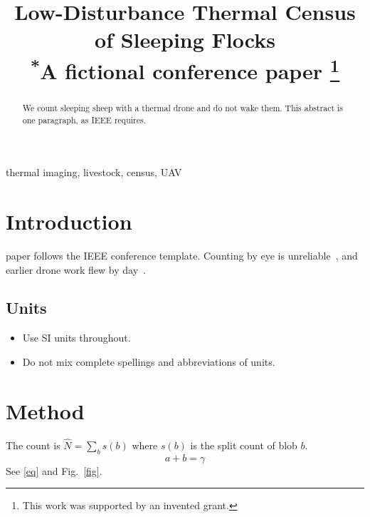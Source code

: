 \documentclass[conference]{IEEEtran}
\begin{document}
\title{Low-Disturbance Thermal Census of Sleeping Flocks\\
{\footnotesize \textsuperscript{*}A fictional conference paper}
\thanks{This work was supported by an invented grant.}
}

\author{
\and
{}
}

\maketitle

\begin{abstract}
We count sleeping sheep with a thermal drone and do not wake them. This abstract is one paragraph, as IEEE requires.
\end{abstract}

\begin{IEEEkeywords}
thermal imaging, livestock, census, UAV
\end{IEEEkeywords}

\section{Introduction}
 paper follows the IEEE conference template. Counting by eye is unreliable~\cite{b1}, and earlier drone work flew by day~\cite{b2,b3}.

\subsection{Units}
\begin{itemize}
\item Use SI units throughout.
\item Do not mix complete spellings and abbreviations of units.
\end{itemize}

\section{Method}
The count is $\hat{N} = \sum_b s(b)$ where $s(b)$ is the split count of blob $b$.
\begin{equation}
a+b=\gamma\label{eq}
\end{equation}
See \eqref{eq} and Fig.~\ref{fig}.
\end{document}
